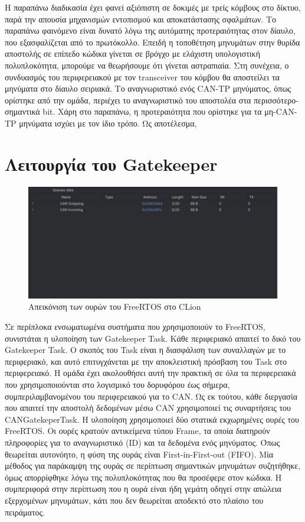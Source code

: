 \documentclass[a4paper,nobib,justified]{tufte-book}
\begin{document}
\FloatBarrier
Η παραπάνω διαδικασία έχει φανεί αξιόπιστη σε δοκιμές με τρείς κόμβους στο δίκτυο, παρά την απουσία μηχανισμών εντοπισμού και αποκατάστασης σφαλμάτων. Το παραπάνω φαινόμενο είναι δυνατό λόγω της αυτόματης προτεραιότητας στον δίαυλο, που εξασφαλίζεται από το πρωτόκολλο. Επειδή η τοποθέτηση μηνυμάτων στην θυρίδα αποστολής σε επίπεδο κώδικα γίνεται σε βρόγχο με ελάχιστη υπολογιστική πολυπλοκότητα, μπορούμε να θεωρήσουμε ότι γίνεται αστραπιαία. Στη συνέχεια, ο συνδυασμός του περιφερειακού με τον transceiver του κόμβου θα αποστείλει τα μηνύματα στο δίαυλο σειριακά. Το αναγνωριστικό ενός CAN-TP μηνύματος, όπως ορίστηκε από την ομάδα, περιέχει το αναγνωριστικό του αποστολέα στα περισσότερο-σημαντικά bit. Χάρη στο παραπάνω, η προτεραιότητα που ορίστηκε για τα μη-CAN-TP μηνύματα ισχύει με τον ίδιο τρόπο. Ως αποτέλεσμα, 

\clearpage
\section{Λειτουργία του Gatekeeper}
\label{sec:gatekeeper}

\begin{figure}
	\centering
	\includegraphics[width=0.8\linewidth]{media/images/clion-queues.pdf}
	\caption{Απεικόνιση των ουρών του FreeRTOS στο CLion}
	\label{fig:clion-queues}
\end{figure}

Σε περίπλοκα ενσωματωμένα συστήματα που χρησιμοποιούν το FreeRTOS, συνιστάται η υλοποίηση των Gatekeeper Task. Κάθε περιφεριακό απαιτεί το δικό του Gatekeeper Task. Ο σκοπός του Task είναι η διασφάλιση των συναλλαγών με το περιφεριακό, και αυτό επιτυγχάνεται με την αποκλειστική πρόσβαση του Task στο περιφερειακό. Η ομάδα έχει ακολουθήσει αυτή την πρακτική σε όλα τα περιφερειακά που χρησιμοποιούνται στο λογισμικό του δορυφόρου έως σήμερα, συμπεριλαμβανομένου του περιφερειακού για το CAN. Ως εκ τούτου, κάθε διεργασία που απαιτεί την αποστολή δεδομένων μέσω CAN χρησιμοποιεί τις συναρτήσεις του CANGatekeperTask. Η υλοποίηση χρησιμοποιεί δύο στατικά εκχωρημένες ουρές του FreeRTOS. Οι ουρές κρατούν αντικείμενα τύπου Frame, τα οποία διατηρούν πληροφορίες για το αναγνωριστικό (ID) και τα δεδομένα ενός μηνύματος. Όπως θεωρείται αυτονόητο, η φύση της ουράς είναι First-in-First-out (FIFO). Μία μέθοδος για παράκαμψη της ουράς σε περίπτωση σημαντικών μηνυμάτων συζητήθηκε, όμως απορρίφθηκε λόγω της πολυπλοκότητας που θα προσέφερε στον κώδικα. Η συμπεριφορά στην περίπτωση που η ουρά είναι ήδη γεμάτη οδηγεί στην απώλεια εξερχομένων μηνυμάτων, κάτι που δεν θεωρείται αποδεκτό στο πλαίσιο του πειράματος.
\end{document}
